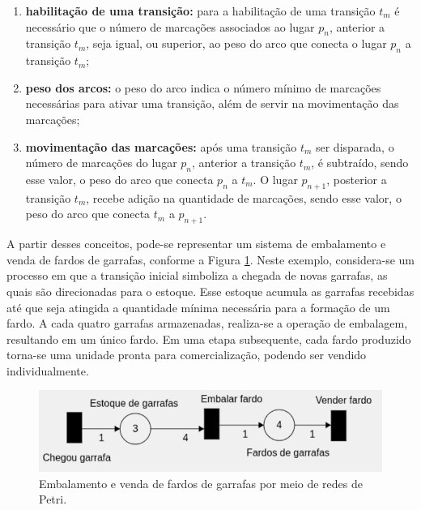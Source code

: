 \documentclass[
	12pt,				%
	openright,			%
	oneside,			%
	a4paper,			%
	english,			%
	brazil				%
	]{abntex2}
\theoremstyle{doispontos}
\newtheorem{exemplo}{Exemplo}
\begin{document}
 \begin{enumerate}[label=(\alph*)]
    \item \textbf{habilitação de uma transição:} para a habilitação de uma transição $t_{m}$ é necessário que o número de marcações associados ao lugar $p_{n}$, anterior a transição $t_{m}$, seja igual, ou superior, ao peso do arco que conecta o lugar $p_{n}$ a transição $t_{m}$;
    \item \textbf{peso dos arcos:} o peso do arco indica o número mínimo de marcações necessárias para ativar uma transição, além de servir na movimentação das marcações;
    \item \textbf{movimentação das marcações:} após uma transição $t_{m}$ ser disparada, o número de marcações do lugar $p_{n}$, anterior a transição $t_{m}$, é subtraído, sendo esse valor, o peso do arco que conecta $p_{n}$ a $t_{m}$. O lugar $p_{n + 1}$, posterior a transição $t_{m}$, recebe adição na quantidade de marcações, sendo esse valor, o peso do arco que conecta $t_{m}$ a $p_{n + 1}$. 
\end{enumerate}

A partir desses conceitos, pode-se representar um sistema de embalamento e venda de fardos de garrafas, conforme a Figura \ref{fig:fardo_garrafa}. Neste exemplo, considera-se um processo em que a transição inicial simboliza a chegada de novas garrafas, as quais são direcionadas para o estoque. Esse estoque acumula as garrafas recebidas até que seja atingida a quantidade mínima necessária para a formação de um fardo. A cada quatro garrafas armazenadas, realiza-se a operação de embalagem, resultando em um único fardo. Em uma etapa subsequente, cada fardo produzido torna-se uma unidade pronta para comercialização, podendo ser vendido individualmente.

\begin{figure}[ht] 
	\centering
	\includegraphics[scale=0.6]{exemplo_fardo_garrafas.png}
	\caption[Embalamento e venda de fardos de garrafas por meio de redes de Petri]{Embalamento e venda de fardos de garrafas por meio de redes de Petri.}
	\label{fig:fardo_garrafa}
\end{figure}


\end{document}
